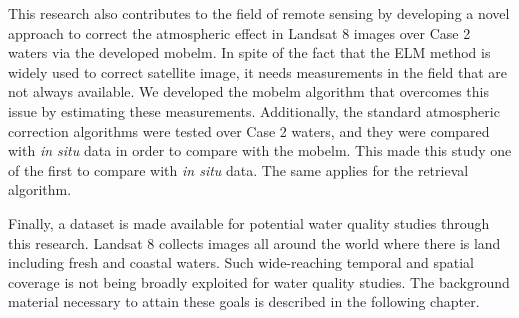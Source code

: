 This research also contributes to the field of remote sensing by developing a novel approach to correct the atmospheric effect in Landsat 8 images over Case 2 waters via the developed \gls{mobelm}. In spite of the fact that the ELM method is widely used to correct satellite image, it needs measurements in the field that are not always available. We developed the \gls{mobelm} algorithm that overcomes this issue by estimating these measurements. Additionally, the standard atmospheric correction algorithms were tested over Case 2 waters, and they were compared with {\it in situ} data in order to compare with the \gls{mobelm}. This made this study one of the first to compare with {\it in situ} data. The same applies for the retrieval algorithm.

Finally, a dataset is made available for potential water quality studies through this research. Landsat 8 collects images all around the world where there is land including fresh and coastal waters. Such wide-reaching temporal and spatial coverage is not being broadly exploited for water quality studies.
The background material necessary to attain these goals is described in the following chapter.
